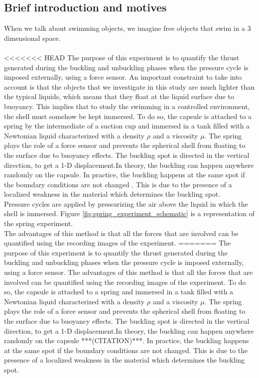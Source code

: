 \subsection{Brief introduction and motives}
When we talk about swimming objects, we imagine free objects that swim in a 3 dimensional space. 
\paragraph{}
<<<<<<< HEAD
The purpose of this experiment is to quantify the thrust generated during the buckling and unbuckling phases when the pressure cycle is imposed externally, using a force sensor. An important constraint to take into account is that the objects that we investigate in this study are much lighter than the typical liquids, which means that they float at the liquid surface due to buoyancy. This implies that to study the swimming in a controlled environment, the shell must somehow be kept immersed. To do so, the capsule is attached to a spring by the intermediate of a suction cup and immersed in a tank filled with a Newtonian liquid characterized with a density $\rho$ and a viscosity $\mu$. The spring plays the role of a force sensor and prevents the spherical shell from floating to the surface due to buoyancy effects.  The buckling spot is directed in the vertical direction, to get a 1-D displacement.In theory, the buckling can happen anywhere randomly on the capsule. In practice, the buckling happens at the same spot if the boundary conditions are not changed \cite{lee16,zhang16}. This is due to the presence of a localized weakness in the material which determines the buckling spot.\\
Pressure cycles are applied by pressurizing the air above the liquid in which the shell is immersed. Figure \ref{fig:spring_experiment_schematic} is a representation of the spring experiment.\\
The advantages of this method is that all the forces that are involved can be quantified using the recording images of the experiment.
=======
The purpose of this experiment is to quantify the thrust generated during the buckling and unbuckling phases when the pressure cycle is imposed externally, using a force sensor. The advantages of this method is that all the forces that are involved can be quantified using the recording images of the experiment. To do so, the capsule is attached to a spring and immersed in a tank filled with a Newtonian liquid characterized with a density $\rho$ and a viscosity $\mu$. The spring plays the role of a force sensor and prevents the spherical shell from floating to the surface due to buoyancy effects.  The buckling spot is directed in the vertical direction, to get a 1-D displacement.In theory, the buckling can happen anywhere randomly on the capsule ***(CITATION)***. In practice, the buckling happens at the same spot if the boundary conditions are not changed. This is due to the presence of a localized weakness in the material which determines the buckling spot.\\
